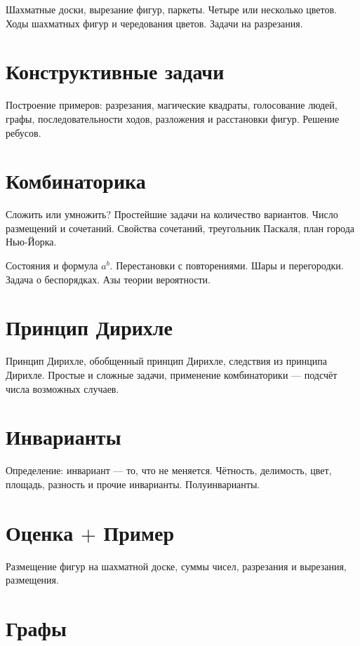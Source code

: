 \documentclass[a4paper,11pt,landscape]{article}
\begin{document}
\begin{paracol}{2}
Шахматные доски, вырезание фигур, паркеты. Четыре или несколько цветов. Ходы шахматных фигур и чередования цветов. Задачи на разрезания. 

\section{Конструктивные задачи}

Построение примеров: разрезания, магические квадраты, голосование людей, графы, последовательности ходов, разложения и расстановки фигур. Решение ребусов.

\section{Комбинаторика}

Сложить или умножить? Простейшие задачи на количество вариантов. Число размещений и сочетаний. Свойства сочетаний, треугольник Паскаля, план города Нью-Йорка. 

Состояния и формула $a^b$\!. Перестановки с повторениями. Шары и перегородки. Задача о беспорядках. Азы теории вероятности.

\switchcolumn
\setcounter{section}{7}

\section{Принцип Дирихле}

Принцип Дирихле, обобщенный принцип Дирихле, следствия из принципа Дирихле. Простые и сложные задачи, применение комбинаторики — подсчёт числа возможных случаев.

\section{Инварианты}

Определение: инвариант — то, что не меняется. Чётность, делимость, цвет, площадь, разность и прочие инварианты. Полуинварианты.

\section{Оценка $+$ Пример}

Размещение фигур на шахматной доске, суммы чисел, разрезания и вырезания, размещения.

\section{Графы}


\end{paracol}
\end{document}

